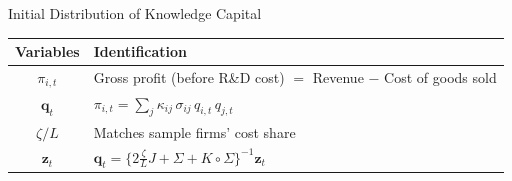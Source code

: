 \documentclass[
  aspectratio=169,  %
]{beamer}
\theoremstyle{plain}
\begin{document}
\begin{frame}{Initial Distribution of Knowledge Capital}
  \begin{table}[htbp]
    \centering
    \begin{tabular}{cl}
      \toprule
     Variables & Identification \\
      \midrule
      $\pi_{i,t}$ 
        & Gross profit (before R\&D cost) 
          $=$ Revenue $-$ Cost of goods sold \\[6pt]
      $\mathbf{q}_t$
        &
          $\pi_{i,t}=\displaystyle\sum_{j}\kappa_{ij}\,\sigma_{ij}\,q_{i,t}\,q_{j,t}$ \\[6pt]
      $\zeta/L$
        & Matches sample firms’ cost share \\[6pt]
      $\mathbf{z}_t$
        &
          $\displaystyle \mathbf{q}_{t}
           =\bigl\{2\frac{\zeta}{L}J+\Sigma+K\circ\Sigma\bigr\}^{-1}\mathbf{z}_{t}$ \\
      \bottomrule
    \end{tabular}
  \end{table}
\end{frame}
%
\end{document}
